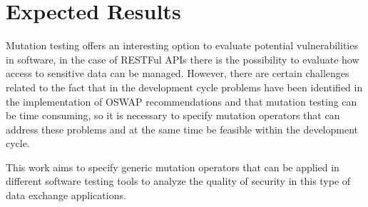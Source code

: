 \chapter{Expected Results}

Mutation testing offers an interesting option to evaluate potential vulnerabilities in software, in the case of RESTFul APIs there is the possibility to evaluate how access to sensitive data can be managed. However, there are certain challenges related to the fact that in the development cycle problems have been identified in the implementation of OSWAP recommendations and that mutation testing can be time consuming, so it is necessary to specify mutation operators that can address these problems and at the same time be feasible within the development cycle.

This work aims to specify generic mutation operators that can be applied in different software testing tools to analyze the quality of security in this type of data exchange applications.